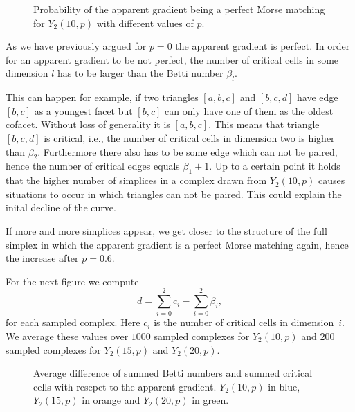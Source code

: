\begin{figure}[H]
\begin{subfigure}[c]{0.95\textwidth}
\begin{center}

\end{center}
\end{subfigure}
\caption{Probability of the apparent gradient being a perfect Morse matching for $Y_2(10,p)$ with different values of $p$.}
\label{fig:perfect_apparent}
\end{figure}

As we have previously argued for $p = 0$ the apparent gradient is perfect. In order for an apparent gradient to be not perfect, the number of critical cells in some dimension $l$ has to be larger than the Betti number $\beta_l$.

This can happen for example, if two triangles $[a,b,c]$ and $[b,c,d]$ have edge $[b,c]$ as a youngest facet but $[b,c]$ can only have one of them as the oldest cofacet. Without loss of generality it is $[a,b,c]$. This means that triangle $[b,c,d]$ is critical, i.e., the number of critical cells in dimension two is higher than $\beta_2$. Furthermore there also has to be some edge which can not be paired, hence the number of critical edges equals $\beta_1 + 1$. Up to a certain point it holds that the higher number of simplices in a complex drawn from $Y_2(10,p)$ causes situations to occur in which triangles can not be paired. This could explain the inital decline of the curve. 

If more and more simplices appear, we get closer to the structure of the full simplex in which the apparent gradient is a perfect Morse matching again, hence the increase after $p = 0.6$.

For the next figure we compute
\[
	d = \sum_{i=0}^2 c_i - \sum_{i=0}^2 \beta_i,
\] for each sampled complex. Here $c_i$ is the number of critical cells in dimension~$i$. We average these values over $1000$ sampled complexes for $Y_2(10,p)$ and $200$ sampled complexes for $Y_2(15,p)$ and $Y_2(20,p)$.

\begin{figure}[H]
\begin{subfigure}[c]{0.95\textwidth}
\begin{center}

\end{center}
\end{subfigure}
\caption{Average difference of summed Betti numbers and summed critical cells with resepct to the apparent gradient. $Y_2(10,p)$ in blue, $Y_2(15,p)$ in orange and $Y_2(20,p)$ in green.}
\label{fig:average_diff_betti_apparent}
\end{figure}


